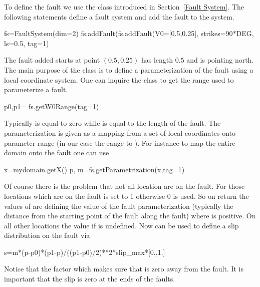 To define the fault we use the  class introduced in Section~\ref{Fault System}. 
The following statements define a fault system  and add the fault  
to the system.
\begin{python}
fs=FaultSystem(dim=2)
fs.addFault(fs.addFault(V0=[0.5,0.25], strikes=90*DEG, ls=0.5, tag=1)
\end{python}
The fault added starts at point $(0.5,0.25)$ has length $0.5$ and is pointing north.
The main purpose of the  class is to define a parameterization
of the fault using a local coordinate system. One can inquire the class
to get the range used to parameterize a fault.
\begin{python}
p0,p1= fs.getW0Range(tag=1)
\end{python}
Typically  is equal to zero while  is equal to the length of the fault. The parameterization
is given as a mapping from a set of local coordinates onto parameter range (in our case 
the range  to ). For instance to map the entire domain  onto the fault 
one can use
\begin{python}
x=mydomain.getX()
p, m=fs.getParametrization(x,tag=1)
\end{python}
Of course there is the problem that not all location are on the fault. For those locations which are on the 
fault  is set to $1$ otherwise $0$ is used. So on return the values of  are defining
the value of the fault parameterization (typically the distance from the starting point of the fault along the fault) 
where  is positive. On all other locations the value if  is undefined. Now  can
be used to define a slip distribution on the fault via
\begin{python}
s=m*(p-p0)*(p1-p)/((p1-p0)/2)**2*slip_max*[0.,1.]
\end{python}
Notice that the factor  which makes sure that  is zero away from the fault. It is important
that the slip is zero at the ends of the faults.

